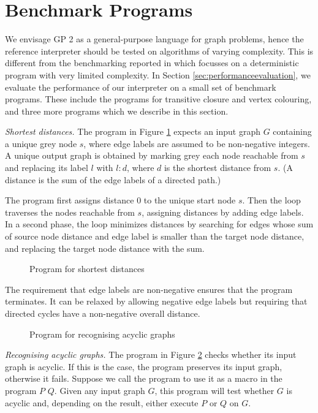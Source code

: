 \section{Benchmark Programs}
\label{sec:benchmark}
 
We envisage GP 2 as a general-purpose language for graph problems, hence the reference interpreter should be tested on algorithms of varying complexity. This is different from the benchmarking reported in \cite{Varro-Schuerr-Varro05a} which focusses on a deterministic program with very limited complexity. In Section \ref{sec:performanceevaluation}, we evaluate the performance of our interpreter on a small set of benchmark programs. These include the programs for transitive closure and vertex colouring, and three more programs which we describe in this section.

\vspace{.5\baselineskip}
\noindent
\emph{Shortest distances.} The program in Figure \ref{fig:shortest-distances} expects an input graph $G$\/ containing a unique grey node $s$, where edge labels are assumed to be non-negative integers. A unique output graph is obtained by marking grey each node reachable from $s$ and replacing its label $l$\/ with $l{:}d$, where $d$\/ is the shortest distance from $s$. (A distance is the sum of the edge labels of a directed path.)
  
The program first assigns distance 0 to the unique start node $s$. Then the loop  traverses the nodes reachable from $s$, assigning distances by adding edge labels. In a second phase, the loop  minimizes distances by searching for edges whose sum of source node distance and edge label is smaller than the target node distance, and replacing the target node distance with the sum.

\begin{figure}[t]
\begin{center}

\end{center}
\caption{Program for shortest distances}\label{fig:shortest-distances}
\end{figure}

The requirement that edge labels are non-negative ensures that the program terminates. It can be relaxed by allowing negative edge labels but requiring that directed cycles have a non-negative overall distance.

\begin{figure}[t]
\begin{center}

\end{center}
\caption{Program for recognising acyclic graphs}\label{fig:acyclicity}
\end{figure}
\vspace{.5\baselineskip}
\noindent
\emph{Recognising acyclic graphs.} The program in Figure \ref{fig:acyclicity} checks whether its input graph is acyclic. If this is the case, the program preserves its input graph, otherwise it fails. Suppose we call the program  to use it as a macro in the program    $P$  $Q$. Given any input graph $G$, this program will test whether $G$\/ is acyclic and, depending on the result, either execute $P$ or $Q$ on $G$.  
  
